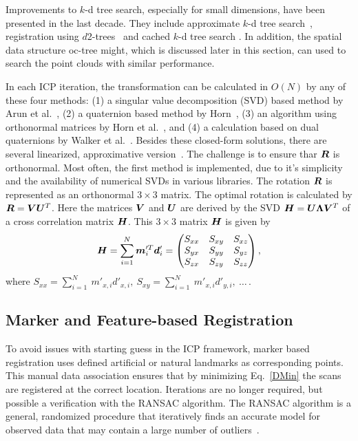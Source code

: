 \documentclass[twocolumn,oneside]{book}
\newcommand{\V}[1]{\vector{#1}}  %
\newcommand{\M}[1]{\V{#1}}    %
\begin{document}
Improvements to $k$-d tree search, especially for small dimensions,
have been presented in the last decade. They include approximate $k$-d
tree search~\cite{Greenspan_2003}, registration using
$d$2-trees~\cite{Mitra_2004} and cached $k$-d tree search
\cite{3DIM_2007}. In addition, the spatial data structure oc-tree
might, which is discussed later in this section, can used to search
the point clouds with similar performance.

In each ICP iteration, the transformation can be calculated in $O(N)$
by any of these four methods: (1) a singular value decomposition (SVD)
based method by Arun et al.~\cite{arun}, (2) a quaternion based
method by Horn~\cite{Horn_1988}, (3) an algorithm using orthonormal
matrices by Horn et al.~\cite{Horn_1987}, and (4) a calculation based
on dual quaternions by Walker et al.~\cite{Walker_1991}. Besides these
closed-form solutions, there are several linearized, approximative
version~\cite{CVIU2010}. The challenge is to ensure thar $\M R$ is
orthonormal. Most often, the first method is implemented, due to it's
simplicity and the availability of numerical SVDs in various
libraries. The rotation $\M R$ is represented as an orthonormal $3
\times 3$ matrix.  The optimal rotation is calculated by $\M R = \M V
\M U^T$. Here the matrices $\M V$ and $\M U$ are derived by the SVD
$\M H = \M U \M \Lambda \M V^T$ of a cross correlation matrix $\M
H$. This $3 \times 3$ matrix $\M H$ is given by
\begin{align}
\M H =  \sum_{i=1}^{N} \V m'^T_i \V d'_i 
 =  \begin{pmatrix}
S_{xx} & S_{xy} & S_{xz} \\
S_{yx} & S_{yy} & S_{yz} \\
S_{zx} & S_{zy} & S_{zz} \\
\end{pmatrix}, \label{korrelation} 
\end{align}
where $S_{xx} = \sum_{i=1}^{N} \ m'_{x,i} d'_{x,i}, \ S_{xy} =
\sum_{i=1}^{N} \ m'_{x,i} d'_{y,i}, \ \ldots \, $.

\subsection{Marker and Feature-based Registration} 

To avoid issues with starting guess in the ICP framework, marker based
registration uses defined artificial or natural landmarks as
corresponding points. This manual data association ensures that by
minimizing Eq.~\eqref{DMin} the scans are registered at the correct
location. Iterations are no longer required, but possible a
verification with the RANSAC algorithm. The RANSAC algorithm is a
general, randomized procedure that iteratively finds an accurate model
for observed data that may contain a large number of
outliers~\cite{ransac}.
\end{document}
